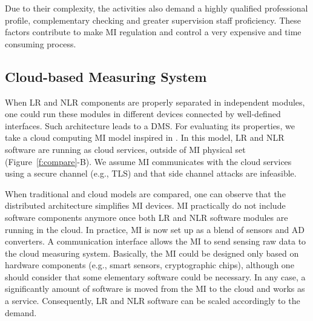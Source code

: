 \documentclass[journal]{IEEEtran}
\begin{document}
Due to their complexity, the activities also demand a highly qualified professional profile, complementary checking and greater supervision staff proficiency. These factors contribute to make MI regulation and control a very expensive and time consuming process.

\subsection{Cloud-based Measuring System}
\label{s:mi_cloud}
When LR and NLR components are properly separated in independent modules, one could run these modules in different devices connected by well-defined interfaces. Such architecture leads to a DMS. For evaluating its properties, we take a cloud computing MI model inspired in \cite{Oppermann2016}. In this model, LR and NLR software are running as cloud services, outside of MI physical set (Figure~\ref{f:compare}-B). We assume MI communicates with the cloud services using a secure channel (e.g., TLS) and that side channel attacks are infeasible.

When traditional and cloud models are compared, one can observe that the distributed architecture simplifies MI devices. MI practically do not include software components anymore once both LR and NLR software modules are running in the cloud. In practice, MI is now set up as a blend of sensors and AD converters.
A communication interface allows the MI to send sensing raw data to the cloud measuring system. 
Basically, the MI could be designed only based on hardware components (e.g., smart sensors, cryptographic chips), although one should consider that some elementary software could be necessary.
In any case, a significantly amount of software is moved from the MI to the cloud and works as a service. 
Consequently, LR and NLR software can be scaled accordingly to the demand.

\end{document}
